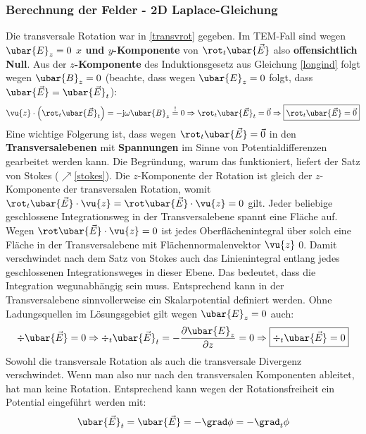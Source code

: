 \subsubsection{Berechnung der Felder - 2D Laplace-Gleichung}
Die transversale Rotation war in \ref{transvrot} gegeben. Im TEM-Fall sind wegen \(\ubar{E}_z=0\) \textbf{\(x\) und \(y\)-Komponente} von \(\rot _t \ubar{\vec{E}}\) also \textbf{offensichtlich Null}. Aus der \textbf{\(z\)-Komponente} des Induktionsgesetz aus Gleichung \ref{longind} folgt wegen \(\ubar{B}_z=0\) (beachte, dass wegen \(\ubar{E}_z=0\) folgt, dass $\ubar{\vec{E}}=\ubar{\vec{E}}_t$):
	\begin{equation}
		\vu{z} \cdot \left(\rot _t \ubar{\vec{E}}_t\right) = -\mathrm{j}\omega\ubar{B}_z  \stackrel{!}{=} 0 \Rightarrow
		\rot _t \ubar{\vec{E}}_t = \vec{0} \Rightarrow \boxed{\rot _t \ubar{\vec{E}} = \vec{0}}
	\end{equation}
Eine wichtige Folgerung ist, dass wegen \(\rot _t \ubar{\vec{E}} = \vec{0}\) in den \textbf{Transversalebenen} mit \textbf{Spannungen} im Sinne von Potentialdifferenzen gearbeitet werden kann. Die Begründung, warum das funktioniert, liefert der Satz von Stokes ($\nearrow$\ref{stokes}). Die $z$-Komponente der Rotation ist gleich der $z$-Komponente der transversalen Rotation, womit $\rot _t \ubar{\vec{E}} \cdot \vu{z}=\rot  \ubar{\vec{E}}\cdot \vu{z}=0$ gilt. Jeder beliebige geschlossene Integrationsweg in der Transversalebene spannt eine Fläche auf. Wegen $\rot  \ubar{\vec{E}}\cdot \vu{z}=0$ ist jedes Oberflächenintegral über solch eine Fläche in der Transversalebene mit Flächennormalenvektor $\vu{z}$ 0. Damit verschwindet nach dem Satz von Stokes auch das Linienintegral entlang jedes geschlossenen Integrationsweges in dieser Ebene. Das bedeutet, dass die Integration wegunabhängig sein muss. Entsprechend kann in der Transversalebene sinnvollerweise ein Skalarpotential definiert werden. Ohne Ladungsquellen im Lösungsgebiet gilt wegen \(\ubar{E}_z=0\) auch:
	\begin{equation}
		\div \ubar{\vec{E}} = 0 \Rightarrow \div _t\ubar{\vec{E}}_t = -\frac{\partial \ubar{E}_z}{\partial z} = 0 \Rightarrow  \boxed{\div _t\ubar{\vec{E}}=0}
	\end{equation}
	Sowohl die transversale Rotation als auch die transversale Divergenz verschwindet. Wenn man also nur nach den transversalen Komponenten ableitet, hat man keine Rotation. Entsprechend kann wegen der Rotationsfreiheit ein Potential eingeführt werden mit:
	\begin{equation}
		\ubar{\vec{E}}_t=\ubar{\vec{E}} = -\grad \phi= -\grad_t \phi 
	\end{equation}
